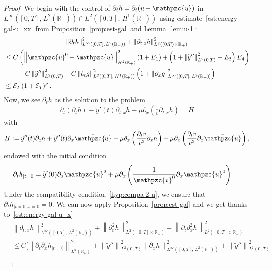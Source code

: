 \documentclass[AHL,Unicode,longabstracts,published]{cedram}
\newcommand{\R}{\mathbb{R}}
\newcommand{\p}{\partial}
\newcommand{\bu}{\bar{\mathpzc{u}}}
\newcommand{\cE}{\mathcal E}
\newcommand{\tv}{\mathpzc{v}}
\newcommand{\tu}{\mathpzc{u}}
\newcommand{\ty}{\widetilde{y}}
\begin{document}
\begin{proof}
We begin with the control of $\p_t h=\partial_t (u-\bu)$ in $L^\infty([0,T],\,L^2(\R_+)) \cap L^2([0,T],\,H^1(\R_+))$ using estimate~\eqref{est:energy-gal-u_xx} from Proposition~\ref{prop:est-gal} and Lemma~\ref{lem:u-1}:
\begin{multline}\label{eq:est-dtu-1}
\left\|\partial_th\right\|_{L^\infty\left([0,T],\,L^2(\R_+)\right)}^2 + \left\|\partial_{t,x}h\right\|_{L^2\left((0,T)\times \R_+\right)}^2\\
\begin{aligned}
& \leq C \left(\left\|\tu^0-\bu\right\|_{H^2(\R_+)}^2 (1+E_1) + \left(1+ \left\|\ty''\right\|_{L^2(0,T)}^2 + E_2\right) E_4\right)\\
&\qquad + C \left\|\ty''\right\|_{L^2(0,T)}^2 + C \left\|\p_t g\right\|_{L^2\left([0,T],\,H^1(\R_+)\right)}^2 \left(1 + \left\|\p_x g\right\|_{L^\infty\left([0,T],\,L^2(\R_+)\right)}^2\right) \\
&\leq \cE_T\left(1 + \cE_T\right)^{p}.
\end{aligned}
\end{multline}
Now, we see $\partial_th$ as the solution to the problem
\begin{align}
\partial_t (\partial_th) -\ty'(t) \partial_{t,x}h - \mu \partial_x \left(\frac{1}{v}\partial_{t,x}h\right) = H
\end{align}
with
\begin{align*}
H := \ty''(t)\partial_xh +\ty''(t)\partial_x \bu- \mu \partial_x\left(\frac{\partial_t v}{v^2} \partial_xh \right) - \mu \partial_x\left(\frac{\partial_t v}{v^2} \partial_x \bu \right),
\end{align*}
endowed with the initial condition
\begin{align*}
\partial_th_{|t=0} & = \ty'(0) \partial_x \tu^0 + \mu \partial_x\left(\frac{1}{\tv^0} \partial_x\tu^0 \right).
\end{align*}
Under the compatibility condition~\eqref{hyp:compa-2-u}, we ensure that $\partial_th_{|t=0, x=0} = 0$. We can now apply Proposition~\ref{prop:est-gal} and we get thanks to~\eqref{est:energy-gal-u_x}
\begingroup
\allowdisplaybreaks
\begin{align*}
&\left\|\partial_{t,x}h\right\|_{L^\infty\left([0,T],\,L^2(\R_+)\right)}^2 + \left\|\partial^2_th\right\|_{L^2\left([0,T]\times \R_+\right)}^2 + \left\|\partial_t \partial^2_xh\right\|_{L^2\left([0,T]\times \R_+\right)}^2 \\
& \leq C \Bigg[\left\|\partial_t \partial_xh_{|t=0}\right\|_{L^2(\R_+)}^2 + \left\|\ty''\right\|_{L^2(0,T)}^2\left\|\p_xh\right\|_{L^\infty\left([0,T],\,L^2(\R_+)\right)}^2 + \left\|\ty''\right\|_{L^2(0,T)}^2\\

\end{align*}
\end{proof}
\end{document}
